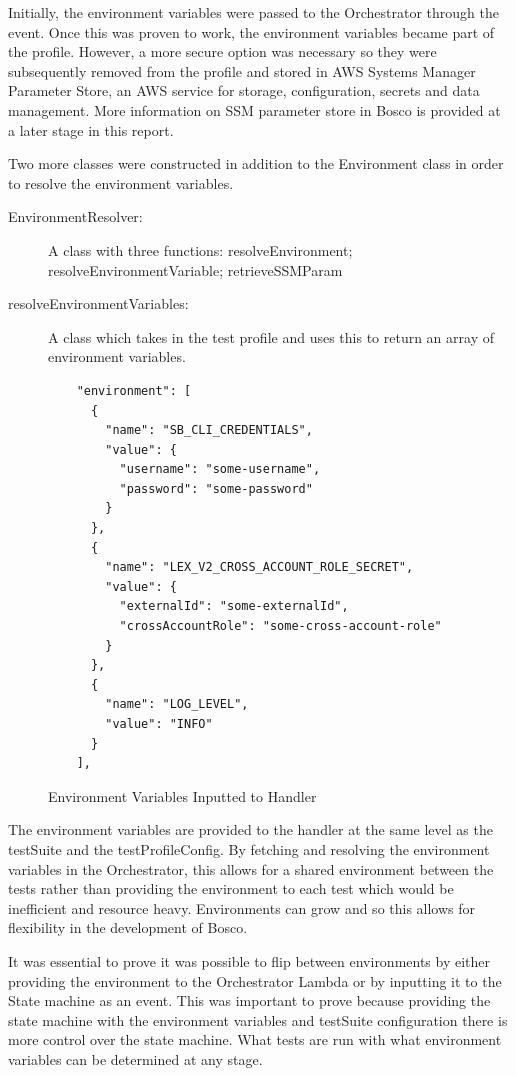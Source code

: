 \documentclass[12pt,a4paper,titlepage]{report}
\begin{document}
Initially, the environment variables were passed to the Orchestrator through the event. Once this was proven to work, the environment variables became part of the profile. However, a more 
secure option was necessary so they were subsequently removed from the profile and stored in AWS Systems Manager Parameter Store, an AWS service for storage, configuration, secrets and data management. 
More information on SSM parameter store in Bosco is provided at a later stage in this report.

Two more classes were constructed in addition to the Environment class in order to resolve the environment variables. 
\begin{description}
  \item[EnvironmentResolver:]A class with three functions: resolveEnvironment; resolveEnvironmentVariable; retrieveSSMParam
  \item[resolveEnvironmentVariables:]A class which takes in the test profile and uses this to return an array of environment variables.
\end{description}

\begin{figure}[H]
  \begin{tcolorbox}
   \begin{verbatim}
    "environment": [
      {
        "name": "SB_CLI_CREDENTIALS",
        "value": {
          "username": "some-username",
          "password": "some-password"
        }
      },
      {
        "name": "LEX_V2_CROSS_ACCOUNT_ROLE_SECRET",
        "value": {
          "externalId": "some-externalId",
          "crossAccountRole": "some-cross-account-role"
        }
      },
      {
        "name": "LOG_LEVEL",
        "value": "INFO"
      }
    ],
 \end{verbatim}
  \end{tcolorbox}
  \caption{Environment Variables Inputted to Handler}
 \end{figure}

The environment variables are provided to the handler at the same level as the testSuite and the testProfileConfig. 
By fetching and resolving the environment variables in the Orchestrator, this allows for a shared environment between the tests rather 
than providing the environment to each test which would be inefficient and resource heavy. Environments can grow and so this allows 
for flexibility in the development of Bosco.

It was essential to prove it was possible to flip between environments by either providing the environment to the
Orchestrator Lambda or by inputting it to the State machine as an event. 
This was important to prove because providing the state machine with the environment variables and testSuite configuration there is more control over the state
machine. What tests are run with what environment variables can be determined at any stage.
\end{document}
